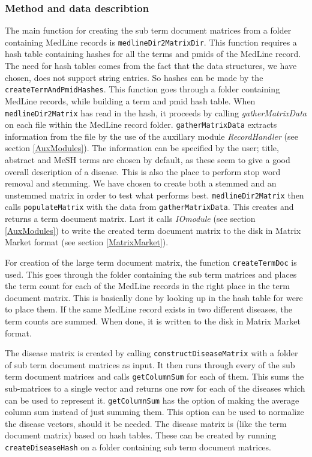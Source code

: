 \subsubsection{Method and data describtion}
The main function for creating the sub term document matrices from a
folder containing MedLine records is
\texttt{medlineDir2MatrixDir}. This function requires a hash table
containing hashes for all the terms and pmids of the MedLine
record. The need for hash tables comes from the fact that the data
structures, we have chosen, does not support string entries. So hashes
can be made by the \texttt{createTermAndPmidHashes}. This function
goes through a folder containing MedLine records, while building a
term and pmid hash table. When \texttt{medlineDir2Matrix} has read in
the hash, it proceeds by calling \textit{gatherMatrixData} on each
file within the MedLine record folder. \texttt{gatherMatrixData}
extracts information from the file by the use of the auxillary module
\textit{RecordHandler} (see section \ref{AuxModules}). The information
can be specified by the user; title, abstract and MeSH terms are
chosen by default, as these seem to give a good overall description of
a disease. This is also the place to perform stop word removal and
stemming. We have chosen to create both a stemmed and an unstemmed
matrix in order to test what performs best. \texttt{medlineDir2Matrix} then
calls \texttt{populateMatrix} with the data from
\texttt{gatherMatrixData}. This creates and returns a term document
matrix. Last it calls \textit{IOmodule} (see section \ref{AuxModules}) to write
the created term document matrix to the disk in Matrix Market format
(see section \ref{MatrixMarket}).

For creation of the large term document matrix, the function
\texttt{createTermDoc} is used. This goes through the folder containing
the sub term matrices and places the term count for each of the
MedLine records in the right place in the term document matrix. This
is basically done by looking up in the hash table for were to place
them. If the same MedLine record exists in two different diseases, the
term counts are summed. When done, it is written to the disk in Matrix
Market format.

The disease matrix is created by calling
\texttt{constructDiseaseMatrix} with a folder of sub term document
matrices as input. It then runs through every of the sub term document
matrices and calls \texttt{getColumnSum} for each of them. This sums
the sub-matrices to a single vector and returns one row for each of
the diseases which can be used to represent it. \texttt{getColumnSum}
has the option of making the average column sum instead of just
summing them. This option can be used to normalize the disease
vectors, should it be needed. The disease matrix is (like the term
document matrix) based on hash tables. These can be created by running
\texttt{createDiseaseHash} on a folder containing sub term document
matrices.

